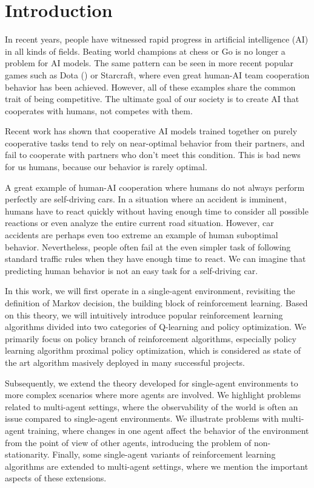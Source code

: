 \chapter*{Introduction}

In recent years, people have witnessed rapid progress in artificial intelligence (AI) in all kinds of fields. 
Beating world champions at chess or Go is no longer a problem for AI models. 
The same pattern can be seen in more recent popular games such as Dota (\cite{DotaOpenFive}) or Starcraft, where even great human-AI team cooperation behavior has been achieved.
However, all of these examples share the common trait of being competitive.
The ultimate goal of our society is to create AI that cooperates with humans, not competes with them.

Recent work has shown that cooperative AI models trained together on purely cooperative tasks tend to rely on near-optimal behavior from their partners, and fail to cooperate with partners who don't meet this condition.
This is bad news for us humans, because our behavior is rarely optimal.

A great example of human-AI cooperation where humans do not always perform perfectly are self-driving cars. 
In a situation where an accident is imminent, humans have to react quickly without having enough time to consider all possible reactions or even analyze the entire current road situation.
However, car accidents are perhaps even too extreme an example of human suboptimal behavior. 
Nevertheless, people often fail at the even simpler task of following standard traffic rules when they have enough time to react.
We can imagine that predicting human behavior is not an easy task for a self-driving car.

In this work, we will first operate in a single-agent environment, revisiting the definition of Markov decision, the building block of reinforcement learning.
Based on this theory, we will intuitively introduce popular reinforcement learning algorithms divided into two categories of Q-learning and policy optimization.
We primarily focus on policy branch of reinforcement algorithms, especially policy learning algorithm proximal policy optimization, which is considered as state of the art algorithm masively deployed in many successful projects.

Subsequently, we extend the theory developed for single-agent environments to more complex scenarios where more agents are involved.
We highlight problems related to multi-agent settings, where the observability of the world is often an issue compared to single-agent environments.
We illustrate problems with multi-agent training, where changes in one agent affect the behavior of the environment from the point of view of other agents, introducing the problem of non-stationarity.
Finally, some single-agent variants of reinforcement learning algorithms are extended to multi-agent settings, where we mention the important aspects of these extensions.


